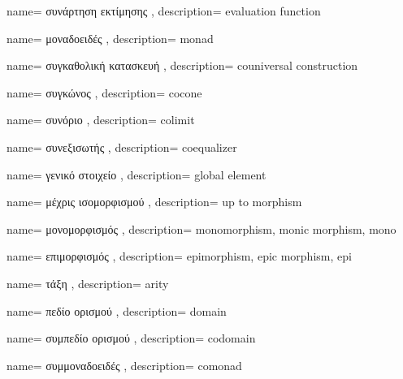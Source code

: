 


{name={
συνάρτηση εκτίμησης
},
description={
evaluation function
}}

{name={
μοναδοειδές
},
description={
monad
}}



{name={
συγκαθολική κατασκευή
},
description={
couniversal construction
}}

{name={
συγκώνος
},
description={
cocone
}}

{name={
συνόριο
},
description={
colimit
}}



{name={
συνεξισωτής
},
description={
coequalizer
}}


{name={
γενικό στοιχείο
},
description={
global element
}}


{name={
μέχρις ισομορφισμού
},
description={
up to morphism
}}


{name={
μονομορφισμός
},
description={
monomorphism, monic morphism, mono
}}

{name={
επιμορφισμός
},
description={
epimorphism, epic morphism, epi
}}


{name={
τάξη
},
description={
arity
}}


{name={
πεδίο ορισμού
},
description={
domain
}}

{name={
συμπεδίο ορισμού
},
description={
codomain
}}

{name={
συμμοναδοειδές
},
description={
comonad
}}



